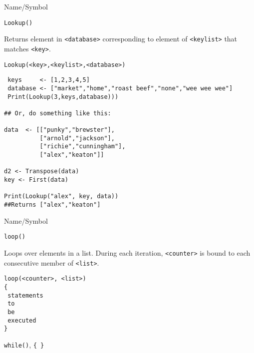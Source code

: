 \rl






\begin{desc}{Name/Symbol}
\item[Name/Symbol]	\verb+Lookup()+

\item[Description] Returns
element in \verb+<database>+ corresponding to element of
\verb+<keylist>+ that matches \verb+<key>+.

\item[Usage]		
\begin{verbatim}
Lookup(<key>,<keylist>,<database>)
\end{verbatim}

\item[Example]	

\begin{verbatim}
 keys     <- [1,2,3,4,5]
 database <- ["market","home","roast beef","none","wee wee wee"]
 Print(Lookup(3,keys,database))) 

## Or, do something like this:
  
data  <- [["punky","brewster"],
          ["arnold","jackson"],
          ["richie","cunningham"],
          ["alex","keaton"]]

d2 <- Transpose(data)
key <- First(data)

Print(Lookup("alex", key, data))
##Returns ["alex","keaton"]
\end{verbatim}
\item[See Also]	
\end{desc}

\rl


\begin{desc}{Name/Symbol}
\item[Name/Symbol]	\verb+loop()+

\item[Description]	Loops over elements in a list.  During each iteration, \verb+<counter>+ is bound to each consecutive member of \verb+<list>+.

\item[Usage]		
\begin{verbatim}
loop(<counter>, <list>)
{
 statements
 to
 be	   
 executed
}
\end{verbatim}

\item[Example]	

\item[See Also]	\verb+while()+, \verb+{ }+
\end{desc}

